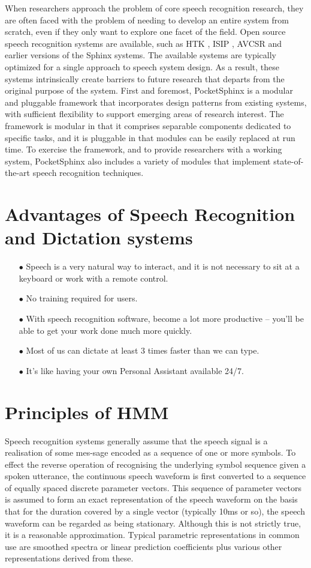 \documentclass[12pt,a4paper,oneside]{memoir}
\begin{document}
When researchers approach the problem of core speech recognition research, they are often faced with the problem of needing to develop an entire system from scratch, even if they only want to explore one facet of the field. Open source speech recognition systems are available, such as HTK , ISIP , AVCSR  and earlier versions of the Sphinx systems. The available systems are typically optimized for a single approach to speech system design. As a result, these systems intrinsically create barriers to future research that departs from the original purpose of the system.  First and foremost, PocketSphinx is a modular and pluggable framework that incorporates design patterns from existing systems, with sufficient flexibility to support emerging areas of research interest. The framework is modular in that it comprises separable components dedicated to specific tasks, and it is pluggable in that modules can be easily replaced at run time. To exercise the framework, and to provide researchers with a working system, PocketSphinx also includes a variety of modules that implement state-of-the-art speech recognition techniques.


\section{Advantages of Speech Recognition and Dictation systems}

\begin{itemize}
  \item[$\bullet$] Speech is a very natural way to interact, and it is not necessary to sit at a keyboard or work with a remote control.
  \item[$\bullet$] No training required for users.
  \item[$\bullet$] With speech recognition software, become a lot more productive – you’ll be able to get your work done much more quickly.
  \item[$\bullet$] Most of us can dictate at least 3 times faster than we can type. 
  \item[$\bullet$] It’s like having your own Personal Assistant available 24/7.	
\end{itemize}

\section{Principles of HMM}
Speech recognition systems generally assume that the speech signal is a realisation of some mes-sage encoded as a sequence of one or more symbols. To effect the reverse operation of recognising the underlying symbol sequence given a spoken utterance, the continuous speech waveform is first converted to a sequence of equally spaced discrete parameter vectors. This sequence of parameter vectors is assumed to form an exact representation of the speech waveform on the basis that for the duration covered by a single vector (typically 10ms or so), the speech waveform can be regarded as being stationary. Although this is not strictly true, it is a reasonable approximation. Typical parametric representations in common use are smoothed spectra or linear prediction coefficients plus various other representations derived from these. 
\end{document}

